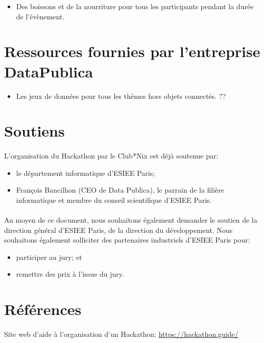 \documentclass{article}
\begin{document}
\begin{itemize}
	\item Des boissons et de la nourriture pour tous les participants pendant
		la durée de l'évènement.
\end{itemize}

\section{Ressources fournies par l'entreprise DataPublica }

\begin{itemize}
	\item Les jeux de données pour tous les thèmes hors objets connectés. ??
\end{itemize}

\section{Soutiens}

\paragraph{}
L'organisation du Hackathon par le Club*Nix est déjà soutenue par:

\begin{itemize}
	\item le département informatique d'ESIEE Paris;
	\item François Bancilhon (CEO de Data Publica), le parrain de la filière
		informatique et membre du conseil scientifique d'ESIEE Paris.
\end{itemize}

\paragraph{}
Au moyen de ce document, nous souhaitons également demander le soutien de la
direction général d'ESIEE Paris, de la direction du développement. Nous
souhaitons également solliciter des partenaires industriels d'ESIEE Paris pour:

\begin{itemize}
	\item participer au jury; et
	\item remettre des prix à l'issue du jury.
\end{itemize}

\section{Références}

\paragraph{}
Site web d'aide à l'organisation d'un Hackathon: \url{https://hackathon.guide/}
\end{document}
